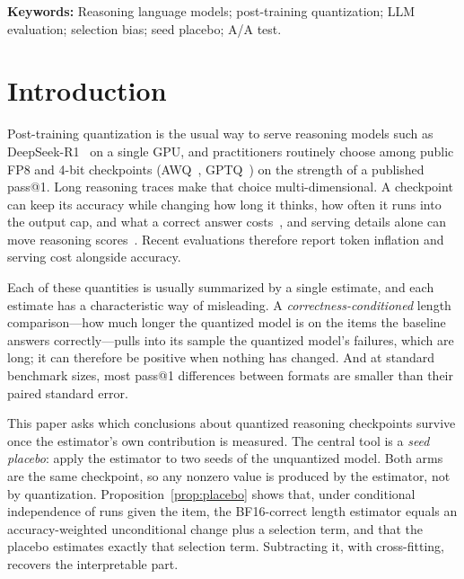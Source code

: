 \documentclass[11pt,a4paper]{article}
\begin{document}
\vspace{0.6em}
\noindent\textbf{Keywords:} Reasoning language models; post-training quantization; LLM evaluation; selection bias; seed placebo; A/A test.

\section{Introduction}
\label{sec:intro}
Post-training quantization is the usual way to serve reasoning models such as DeepSeek-R1~\cite{guo2025deepseekr1} on a single GPU, and practitioners routinely choose among public FP8 and 4-bit checkpoints (AWQ~\cite{lin2023awq}, GPTQ~\cite{frantar2022gptq}) on the strength of a published pass@1. Long reasoning traces make that choice multi-dimensional. A checkpoint can keep its accuracy while changing how long it thinks, how often it runs into the output cap, and what a correct answer costs~\cite{lian2026quantinflates,liu2025qrm,lotfi2026overthinking,erol2025costofpass,kurtic2025give}, and serving details alone can move reasoning scores~\cite{hochlehnert2025sober}. Recent evaluations therefore report token inflation and serving cost alongside accuracy.

Each of these quantities is usually summarized by a single estimate, and each estimate has a characteristic way of misleading. A \emph{correctness-conditioned} length comparison---how much longer the quantized model is on the items the baseline answers correctly---pulls into its sample the quantized model's failures, which are long; it can therefore be positive when nothing has changed. And at standard benchmark sizes, most pass@1 differences between formats are smaller than their paired standard error.

This paper asks which conclusions about quantized reasoning checkpoints survive once the estimator's own contribution is measured. The central tool is a \emph{seed placebo}: apply the estimator to two seeds of the unquantized model. Both arms are the same checkpoint, so any nonzero value is produced by the estimator, not by quantization. Proposition~\ref{prop:placebo} shows that, under conditional independence of runs given the item, the BF16-correct length estimator equals an accuracy-weighted unconditional change plus a selection term, and that the placebo estimates exactly that selection term. Subtracting it, with cross-fitting, recovers the interpretable part.
\end{document}
